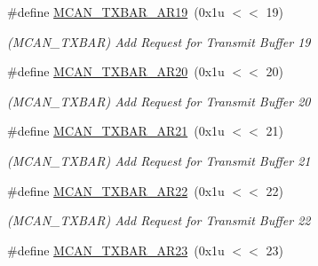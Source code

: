 \begin{DoxyCompactItemize}
\mbox{\label{group__SAME70__MCAN_gaee41bbabfa07ec94552a339c8a34de3a}} 
\#define \mbox{\hyperlink{group__SAME70__MCAN_gaee41bbabfa07ec94552a339c8a34de3a}{M\+C\+A\+N\+\_\+\+T\+X\+B\+A\+R\+\_\+\+A\+R19}}~(0x1u $<$$<$ 19)
\begin{DoxyCompactList}\small\item\em (M\+C\+A\+N\+\_\+\+T\+X\+B\+AR) Add Request for Transmit Buffer 19 \end{DoxyCompactList}\item 
\mbox{\label{group__SAME70__MCAN_ga69658eb6a547b677c99cf51742eec079}} 
\#define \mbox{\hyperlink{group__SAME70__MCAN_ga69658eb6a547b677c99cf51742eec079}{M\+C\+A\+N\+\_\+\+T\+X\+B\+A\+R\+\_\+\+A\+R20}}~(0x1u $<$$<$ 20)
\begin{DoxyCompactList}\small\item\em (M\+C\+A\+N\+\_\+\+T\+X\+B\+AR) Add Request for Transmit Buffer 20 \end{DoxyCompactList}\item 
\mbox{\label{group__SAME70__MCAN_gaad6471eb5b82b35a6c68a01e4c6f916b}} 
\#define \mbox{\hyperlink{group__SAME70__MCAN_gaad6471eb5b82b35a6c68a01e4c6f916b}{M\+C\+A\+N\+\_\+\+T\+X\+B\+A\+R\+\_\+\+A\+R21}}~(0x1u $<$$<$ 21)
\begin{DoxyCompactList}\small\item\em (M\+C\+A\+N\+\_\+\+T\+X\+B\+AR) Add Request for Transmit Buffer 21 \end{DoxyCompactList}\item 
\mbox{\label{group__SAME70__MCAN_gadf44a72988d526f8c84fbec840a7cb87}} 
\#define \mbox{\hyperlink{group__SAME70__MCAN_gadf44a72988d526f8c84fbec840a7cb87}{M\+C\+A\+N\+\_\+\+T\+X\+B\+A\+R\+\_\+\+A\+R22}}~(0x1u $<$$<$ 22)
\begin{DoxyCompactList}\small\item\em (M\+C\+A\+N\+\_\+\+T\+X\+B\+AR) Add Request for Transmit Buffer 22 \end{DoxyCompactList}\item 
\mbox{\label{group__SAME70__MCAN_gae9cf056cf0aa329dbc8f7e6ba3749a9d}} 
\#define \mbox{\hyperlink{group__SAME70__MCAN_gae9cf056cf0aa329dbc8f7e6ba3749a9d}{M\+C\+A\+N\+\_\+\+T\+X\+B\+A\+R\+\_\+\+A\+R23}}~(0x1u $<$$<$ 23)
$$
\end{DoxyCompactItemize}
